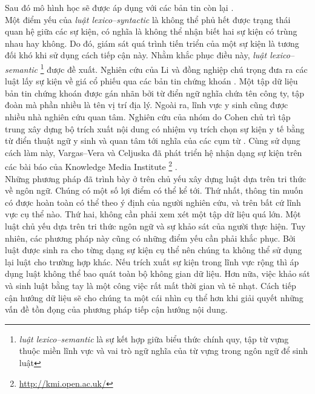 Sau đó mô hình học sẽ được áp dụng với các bản tin còn lại \cite{FHH06}. \\
\noindent Một điểm yếu của \emph{luật lexico--syntactic} là không thể phủ hết được trạng thái quan hệ giữa các sự kiện, có nghĩa là không thể nhận biết hai sự kiện có trùng nhau hay không. Do đó, giám sát quá trình tiến triển của một sự kiện là tương đối khó khi sử dụng cách tiếp cận này. Nhằm khắc phục điều này, \emph{luật lexico--semantic} \footnote{\emph{luật lexico--semantic} là sự kết hợp giữa biểu thức chính quy, tập từ vựng thuộc miền lĩnh vực và vai trò ngữ nghĩa của từ vựng trong ngôn ngữ để sinh luật} được đề xuất. Nghiên cứu của Li và đồng nghiệp chú trọng đưa ra các luật lấy sự kiện về giá cổ phiếu qua các bản tin chứng khoán \cite{FHD02}. Một tập dữ liệu bản tin chứng khoán được gán nhãn bởi từ điển ngữ nghĩa chứa tên  công ty, tập đoàn mà phần nhiều là tên vị trí địa lý. Ngoài ra, lĩnh vực y sinh cũng được nhiều nhà nghiên cứu quan tâm. Nghiên cứu của nhóm do Cohen chủ trì tập trung xây dựng bộ trích xuất nội dung có nhiệm vụ trích chọn sự kiện y tế bằng từ điển thuật ngữ y sinh và quan tâm tới nghĩa của các cụm từ \cite{CVJ09}. Cùng sử dụng cách làm này, Vargas--Vera và Celjuska đã phát triển hệ nhận dạng sự kiện trên các bài báo của Knowledge Media Institute \footnote{\href{http://kmi.open.ac.uk/}{http://kmi.open.ac.uk/}} \cite{MD04}.\\
\noident Những phương pháp đã trình bày ở trên chủ yếu xây dựng luật dựa trên tri thức về ngôn ngữ. Chúng có một số lợi điểm có thể kể tới. Thứ nhất, thông tin muốn có được hoàn toàn có thể theo ý định của người nghiên cứu, và trên bất cứ lĩnh vực cụ thể nào. Thứ hai, không cần phải xem xét một tập dữ liệu quá lớn. Một luật chủ yếu dựa trên tri thức ngôn ngữ và sự khảo sát của người thực hiện. Tuy nhiên, các  phương pháp này cũng có những điểm yếu cần phải khắc phục. Bởi luật được sinh ra cho từng dạng sự kiện cụ thể nên chúng ta không thể sử dụng lại luật cho trường hợp khác. Nếu trích xuất sự kiện trong lĩnh vực rộng thì áp dụng luật không thể bao quát toàn bộ không gian dữ liệu. Hơn nữa, việc khảo sát và sinh luật bằng tay là một công việc rất mất thời gian và tẻ nhạt. Cách tiếp cận hướng dữ liệu sẽ cho chúng ta một cái nhìn cụ thể hơn khi giải quyết những vấn đề tồn đọng của phương pháp tiếp cận hướng nội dung.
\\
